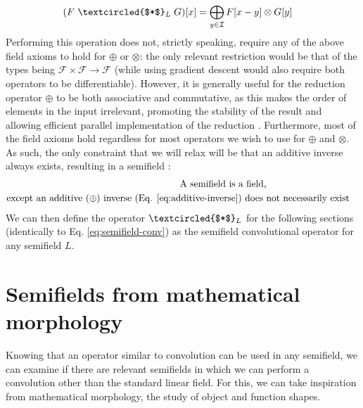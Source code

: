 \documentclass[a4paper, 12pt]{report}
\begin{document}
\begin{align}
	(F ~\textcircled{$*$}_L\; G)[x] &=\bigoplus_{y\in \mathcal{I}} F[x-y] \otimes G[y] \label{eq:semifield-conv}
\end{align}
\noindent
Performing this operation does not, strictly speaking, require any of the above field axioms to hold for $\oplus$ or $\otimes$: the only relevant restriction would be that of the types being $\mathcal{F}\times\mathcal{F}\rightarrow\mathcal{F}$ (while using gradient descent would also require both operators to be differentiable). However, it is generally useful for the reduction operator $\oplus$ to be both associative and commutative, as this makes the order of elements in the input irrelevant, promoting the stability of the result and allowing efficient parallel implementation of the reduction \cite{ppad}. Furthermore, most of the field axioms hold regardless for most operators we wish to use for $\oplus$ and $\otimes$. As such, the only constraint that we will relax will be that an additive inverse always exists, resulting in a semifield \cite{bellaardaxiomatic}:
\begin{align}
	\textrm{A semifield is a field,}\nonumber \\ \textrm{except an additive ($\oplus$) inverse (Eq. \ref{eq:additive-inverse}) does }& \textrm{not necessarily exist}\nonumber
\end{align}
\noindent
We can then define the operator $\textcircled{$*$}_L$ for the following sections (identically to Eq. \ref{eq:semifield-conv}) as the semifield convolutional operator for any semifield $L$.

\section{Semifields from mathematical morphology}
Knowing that an operator similar to convolution can be used in any semifield, we can examine if there are relevant semifields in which we can perform a convolution other than the standard linear field. For this, we can take inspiration from mathematical morphology, the study of object and function shapes.
\end{document}
